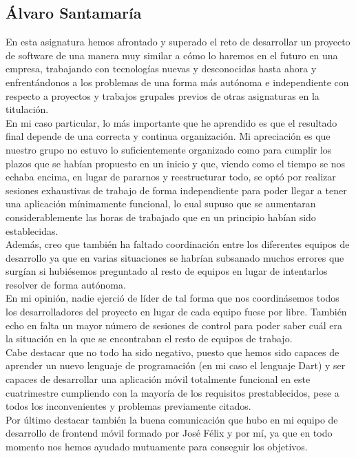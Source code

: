 \documentclass{article}
\begin{document}
\subsection*{Álvaro Santamaría}
En esta asignatura hemos afrontado y superado el reto de desarrollar un proyecto de software de una manera muy similar a cómo lo haremos en el futuro en una empresa, trabajando con tecnologías nuevas y desconocidas hasta ahora y enfrentándonos a los problemas de una forma más autónoma e independiente con respecto a proyectos y trabajos grupales previos de otras asignaturas en la titulación.\\
\hfill \break
En mi caso particular, lo más importante que he aprendido es que el resultado final depende de una correcta y continua organización. Mi apreciación es que nuestro grupo no estuvo lo suficientemente organizado como para cumplir los plazos que se habían propuesto en un inicio y que, viendo como el tiempo se nos echaba encima, en lugar de pararnos y reestructurar todo, se optó por realizar sesiones exhaustivas de trabajo de forma independiente para poder llegar a tener una aplicación mínimamente funcional, lo cual supuso que se aumentaran considerablemente las horas de trabajado que en un principio habían sido establecidas.\\
\hfill \break
Además, creo que también ha faltado coordinación entre los diferentes equipos de desarrollo ya que en varias situaciones se habrían subsanado muchos errores que surgían si hubiésemos preguntado al resto de equipos en lugar de intentarlos resolver de forma autónoma.\\
\hfill \break
En mi opinión, nadie ejerció de líder de tal forma que nos coordinásemos todos los desarrolladores del proyecto en lugar de cada equipo fuese por libre. También echo en falta un mayor número de sesiones de control para poder saber cuál era la situación en la que se encontraban el resto de equipos de trabajo.\\
\hfill \break
Cabe destacar que no todo ha sido negativo, puesto que hemos sido capaces de aprender un nuevo lenguaje de programación (en mi caso el lenguaje Dart) y ser capaces de desarrollar una aplicación móvil totalmente funcional en este cuatrimestre cumpliendo con la mayoría de los requisitos prestablecidos, pese a todos los inconvenientes y problemas previamente citados.\\
\hfill \break
Por último destacar también la buena comunicación que hubo en mi equipo de desarrollo de frontend móvil formado por José Félix y por mí, ya que en todo momento nos hemos ayudado mutuamente para conseguir los objetivos.
\end{document}
